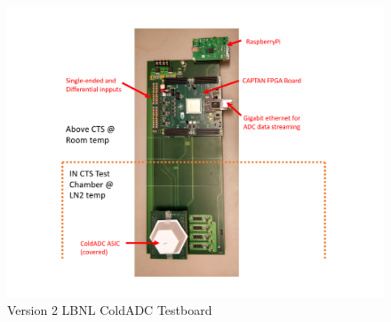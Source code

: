 \begin{figure}[!ht]
\centering
 \includegraphics[width=0.85\linewidth]{figures/prakash_fig/TestBoard2_CTS.pdf}
  \caption[LBNL ColdADC Testboard]{Version 2 LBNL ColdADC Testboard}
  \label{fig:v2_board}
\end{figure}


